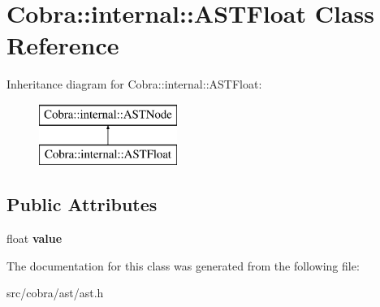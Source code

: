 \hypertarget{class_cobra_1_1internal_1_1_a_s_t_float}{\section{Cobra\+:\+:internal\+:\+:A\+S\+T\+Float Class Reference}
\label{class_cobra_1_1internal_1_1_a_s_t_float}
}
Inheritance diagram for Cobra\+:\+:internal\+:\+:A\+S\+T\+Float\+:\begin{figure}[H]
\begin{center}
\leavevmode
\includegraphics[height=2.000000cm]{class_cobra_1_1internal_1_1_a_s_t_float}
\end{center}
\end{figure}
\subsection*{Public Attributes}
\begin{DoxyCompactItemize}
\item 
\hypertarget{class_cobra_1_1internal_1_1_a_s_t_float_ae6955ebe85532ecd20cc8dd4f721f6fe}{float {\bfseries value}}\label{class_cobra_1_1internal_1_1_a_s_t_float_ae6955ebe85532ecd20cc8dd4f721f6fe}

\end{DoxyCompactItemize}


The documentation for this class was generated from the following file\+:\begin{DoxyCompactItemize}
\item 
src/cobra/ast/ast.\+h\end{DoxyCompactItemize}
